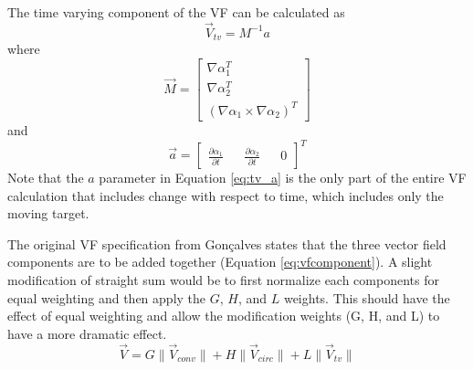 \documentclass[conf]{new-aiaa}
\begin{document}
The time varying component of the VF can be calculated as
\begin{equation} \label{eq:vtv}
\overrightarrow{V}_{tv} = M^{-1}a
\end{equation}
where
\begin{equation}
\overrightarrow{M} = \begin{bmatrix} \nabla \alpha_1^T \\ \nabla \alpha_2^T \\ (\nabla \alpha_1 \times \nabla \alpha_2)^T \end{bmatrix}
\end{equation}
and
\begin{equation}\label{eq:tv_a}
\overrightarrow{a} = \begin{bmatrix} \frac{\partial\alpha_1}{\partial t} &&  \frac{\partial\alpha_2}{\partial t} && 0\end{bmatrix}^T
\end{equation}
Note that the $a$ parameter in Equation \ref{eq:tv_a} is the only part of the entire VF calculation that includes change with respect to time, which includes only the moving target.

The original VF specification from Gon\c{c}alves states that the three vector field components are to be added together (Equation \ref{eq:vfcomponent}). A slight modification of straight sum would be to first normalize each components for equal weighting and then apply the $G$, $H$, and $L$ weights. This should have the effect of equal weighting and allow the modification weights (G, H, and L) to have a more dramatic effect.
\begin{equation}\label{eq:vfcomponentmod}
\overrightarrow{V} = G \lVert \overrightarrow{V}_{conv} \rVert+ H \lVert \overrightarrow{V}_{circ} \rVert + L \lVert \overrightarrow{V}_{tv}\rVert
\end{equation}
\end{document}

